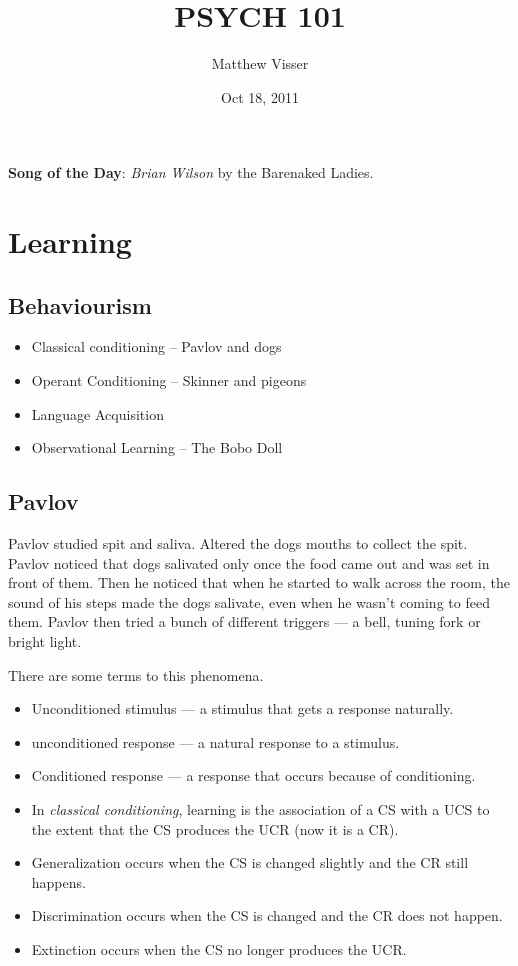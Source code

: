 \documentclass[12pt]{article}
\begin{document}
\title{PSYCH 101}
\author{Matthew Visser}
\date{Oct 18, 2011}
\maketitle

\textbf{Song of the Day}: \emph{Brian Wilson} by the Barenaked Ladies.

\section{Learning}

\subsection{Behaviourism}

\begin{itemize}
	\item Classical conditioning -- Pavlov and dogs
	\item Operant Conditioning -- Skinner and pigeons
	\item Language Acquisition
	\item Observational Learning -- The Bobo Doll
\end{itemize}

\subsection{Pavlov}

Pavlov studied spit and saliva. Altered the dogs mouths to collect the spit.
Pavlov noticed that dogs salivated only once the food came out and was set in
front of them. Then he noticed that when he started to walk across the room, the
sound of his steps made the dogs salivate, even when he wasn't coming to feed
them. Pavlov then tried a bunch of different triggers --- a bell, tuning fork or
bright light.

There are some terms to this phenomena.
\begin{itemize}
	\item Unconditioned stimulus --- a stimulus that gets a response naturally.
	\item unconditioned response --- a natural response to a stimulus.
	\item Conditioned response --- a response that occurs because of
		conditioning.
\end{itemize}

\begin{itemize}
	\item In \emph{classical conditioning}, learning is the association of a CS
		with a UCS to the extent that the CS produces the UCR (now it is a CR).  
	\item Generalization occurs when the CS is changed slightly and the CR still
		happens. 
	\item Discrimination occurs when the CS is changed and the CR does not
		happen.
	\item Extinction occurs when the CS no longer produces the UCR.
\end{itemize}
\end{document}
